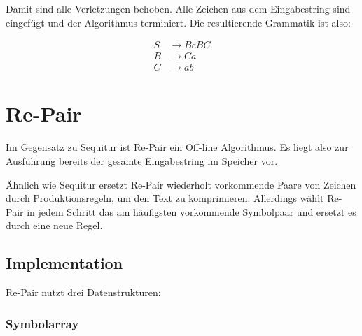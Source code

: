 Damit sind alle Verletzungen behoben. Alle Zeichen aus dem Eingabestring sind eingefügt und der Algorithmus terminiert. Die resultierende Grammatik ist also:

\begin{align*}
	S &\rightarrow BcBC\\
	B &\rightarrow Ca\\
	C &\rightarrow ab
\end{align*}



\section{Re-Pair}
\label{repair}

Im Gegensatz zu Sequitur ist Re-Pair \cite{larsson_off-line_2000} ein Off-line Algorithmus. Es liegt also zur Ausführung bereits der gesamte Eingabestring im Speicher vor.

Ähnlich wie Sequitur ersetzt Re-Pair wiederholt vorkommende Paare von Zeichen durch Produktionsregeln, um den Text zu komprimieren. Allerdings wählt Re-Pair in jedem Schritt das am häufigsten vorkommende Symbolpaar und ersetzt es durch eine neue Regel.

\subsection{Implementation}

Re-Pair nutzt drei Datenstrukturen:

\subsubsection{Symbolarray}

